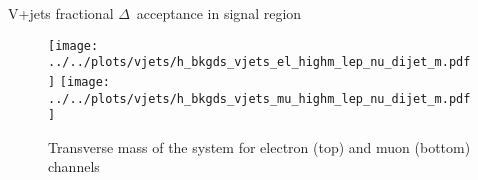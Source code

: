 \documentclass{article}
\begin{document}
\begin{table}[htbp]
  \centering
  \caption{V+jets fractional $\Delta$~acceptance in signal region}
\end{table}


\begin{figure}[h]
  \centering
  \texttt{[image: ../../plots/vjets/h\_bkgds\_vjets\_el\_highm\_lep\_nu\_dijet\_m.pdf]}
  \texttt{[image: ../../plots/vjets/h\_bkgds\_vjets\_mu\_highm\_lep\_nu\_dijet\_m.pdf]}
  
  \caption{Transverse mass of the system for electron (top) and muon (bottom) channels}
\end{figure}
\end{document}
